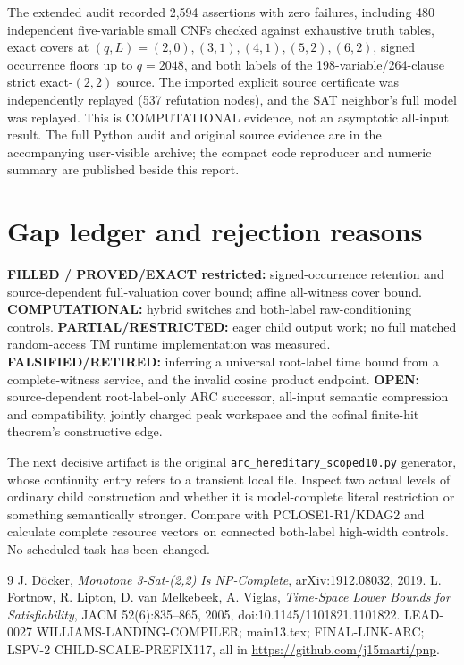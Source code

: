 \documentclass[11pt]{article}
\begin{document}
The extended audit recorded 2,594 assertions with zero failures, including 480 independent five-variable small CNFs checked against exhaustive truth tables, exact covers at $(q,L)=(2,0),(3,1),(4,1),(5,2),(6,2)$, signed occurrence floors up to $q=2048$, and both labels of the 198-variable/264-clause strict exact-$(2,2)$ source. The imported explicit source certificate was independently replayed (537 refutation nodes), and the SAT neighbor's full model was replayed. This is COMPUTATIONAL evidence, not an asymptotic all-input result. The full Python audit and original source evidence are in the accompanying user-visible archive; the compact code reproducer and numeric summary are published beside this report.

\section{Gap ledger and rejection reasons}
\par\noindent \textbf{FILLED / PROVED/EXACT restricted:} signed-occurrence retention and source-dependent full-valuation cover bound; affine all-witness cover bound. \textbf{COMPUTATIONAL:} hybrid switches and both-label raw-conditioning controls. \textbf{PARTIAL/RESTRICTED:} eager child output work; no full matched random-access TM runtime implementation was measured. \textbf{FALSIFIED/RETIRED:} inferring a universal root-label time bound from a complete-witness service, and the invalid cosine product endpoint. \textbf{OPEN:} source-dependent root-label-only ARC successor, all-input semantic compression and compatibility, jointly charged peak workspace and the cofinal finite-hit theorem's constructive edge.

The next decisive artifact is the original \texttt{arc\_hereditary\_scoped10.py} generator, whose continuity entry refers to a transient local file. Inspect two actual levels of ordinary child construction and whether it is model-complete literal restriction or something semantically stronger. Compare with PCLOSE1-R1/KDAG2 and calculate complete resource vectors on connected both-label high-width controls. No scheduled task has been changed.

\begin{thebibliography}{9}
 J. D\"ocker, \emph{Monotone 3-Sat-(2,2) Is NP-Complete}, arXiv:1912.08032, 2019.
 L. Fortnow, R. Lipton, D. van Melkebeek, A. Viglas, \emph{Time-Space Lower Bounds for Satisfiability}, JACM 52(6):835--865, 2005, doi:10.1145/1101821.1101822.
 LEAD-0027 WILLIAMS-LANDING-COMPILER; main13.tex; FINAL-LINK-ARC; LSPV-2 CHILD-SCALE-PREFIX117, all in \url{https://github.com/j15marti/pnp}.
\end{thebibliography}
\end{document}
